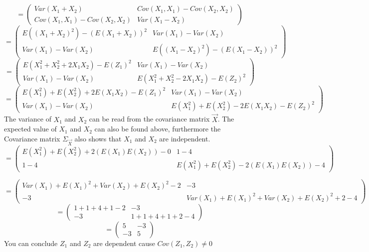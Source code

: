 \documentclass[pdftex,12pt,a4paper]{article}
\begin{document}
    $$
    	=
    	\begin{pmatrix}
    		Var(X_1+X_2) & Cov(X_1, X_1) - Cov(X_2, X_2)\\
    		Cov(X_1, X_1) - Cov(X_2, X_2) & Var(X_1-X_2)
    	\end{pmatrix}$$
    $$
    	=
    	\begin{pmatrix}
    		E((X_1+X_2)^2) - (E(X_1+X_2))^2 & Var(X_1) - Var(X_2)\\
    		Var(X_1) - Var(X_2) & E((X_1-X_2)^2) - (E(X_1-X_2))^2
    	\end{pmatrix}$$
    $$
    	=
    	\begin{pmatrix}
    		E(X_1^2+X_2^2+2X_1X_2) - E(Z_1)^2 & Var(X_1) - Var(X_2)\\
    		Var(X_1) - Var(X_2) & E(X_1^2+X_2^2-2X_1X_2) - E(Z_2)^2
    	\end{pmatrix}$$
    $$
    	=
    	\begin{pmatrix}
    		E(X_1^2)+E(X_2^2)+2E(X_1X_2) - E(Z_1)^2 & Var(X_1) - Var(X_2)\\
    		Var(X_1) - Var(X_2) & E(X_1^2)+E(X_2^2)-2E(X_1X_2) - E(Z_2)^2
    	\end{pmatrix}$$
    The variance of $X_1$ and $X_2$ can be read from the covariance matrix $\vec{X}$.
    The expected value of $X_1$ and $X_2$ can also be found above, furthermore the
    Covariance matrix $\Sigma_{\vec{X}}$ also shows that $X_1$ and $X_2$ are independent.
    $$
    	=
    	\begin{pmatrix}
    		E(X_1^2)+E(X_2^2)+2(E(X_1)E(X_2)) - 0 & 1 - 4\\
    		1 - 4 & E(X_1^2)+E(X_2^2) - 2(E(X_1)E(X_2)) - 4
    	\end{pmatrix}$$
    
    $$
    	=
    	\begin{pmatrix}
    		Var(X_1) + E(X_1)^2 + Var(X_2) + E(X_2)^2 - 2 & -3\\
    		-3 & Var(X_1) + E(X_1)^2 + Var(X_2) + E(X_2)^2 + 2 - 4
    	\end{pmatrix}$$
    $$
    	=
    	\begin{pmatrix}
    		1 + 1 + 4 + 1 - 2 & -3\\
    		-3 & 1 + 1 + 4 + 1 + 2 - 4
    	\end{pmatrix}$$
    $$
    	=
    	\begin{pmatrix}
    		5 & -3\\
    		-3 & 5
    	\end{pmatrix}$$
    You can conclude $Z_1$ and $Z_2$ are dependent cause $Cov(Z_1, Z_2) \neq 0$
\newpage
\end{document}
